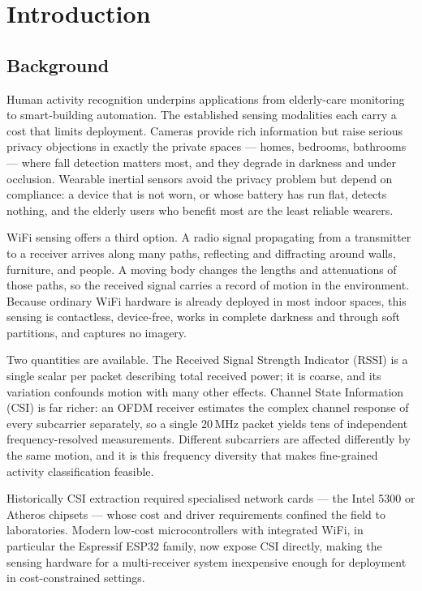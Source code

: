 \chapter{Introduction}
\label{ch:introduction}

\section{Background}

Human activity recognition underpins applications from elderly-care
monitoring to smart-building automation. The established sensing modalities
each carry a cost that limits deployment. Cameras provide rich information
but raise serious privacy objections in exactly the private spaces --- homes,
bedrooms, bathrooms --- where fall detection matters most, and they degrade
in darkness and under occlusion. Wearable inertial sensors avoid the privacy
problem but depend on compliance: a device that is not worn, or whose battery
has run flat, detects nothing, and the elderly users who benefit most are the
least reliable wearers.

WiFi sensing offers a third option. A radio signal propagating from a
transmitter to a receiver arrives along many paths, reflecting and
diffracting around walls, furniture, and people. A moving body changes the
lengths and attenuations of those paths, so the received signal carries a
record of motion in the environment. Because ordinary WiFi hardware is
already deployed in most indoor spaces, this sensing is contactless,
device-free, works in complete darkness and through soft partitions, and
captures no imagery.

Two quantities are available. The Received Signal Strength Indicator (RSSI)
is a single scalar per packet describing total received power; it is coarse,
and its variation confounds motion with many other effects. Channel State
Information (CSI) is far richer: an OFDM receiver estimates the complex
channel response of every subcarrier separately, so a single 20\,MHz packet
yields tens of independent frequency-resolved measurements. Different
subcarriers are affected differently by the same motion, and it is this
frequency diversity that makes fine-grained activity classification
feasible.

Historically CSI extraction required specialised network cards --- the Intel
5300 or Atheros chipsets --- whose cost and driver requirements confined the
field to laboratories. Modern low-cost microcontrollers with integrated WiFi,
in particular the Espressif ESP32 family, now expose CSI directly, making
the sensing hardware for a multi-receiver system inexpensive enough for
deployment in cost-constrained settings.

